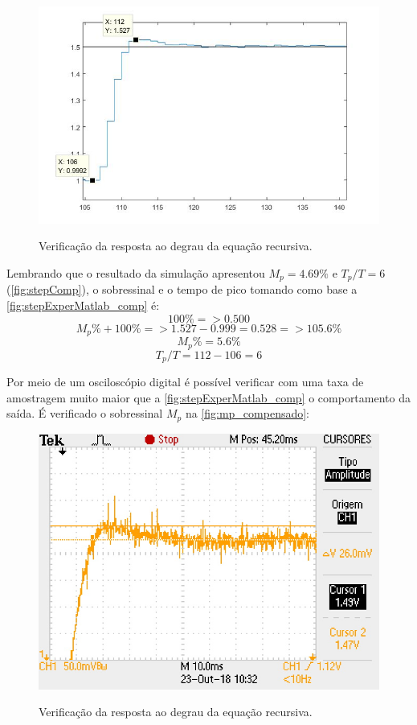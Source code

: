 \documentclass[
	article,			%
	11pt,				%
	oneside,			%
	a4paper,			%
	english,			%
	brazil,				%
	sumario=tradicional
	]{abntex2}
\begin{document}
\begin{figure}[htb!]
	\centering
	\caption{Verificação da resposta ao degrau da equação recursiva.}
	\includegraphics[scale=0.7]{./img/stepExperMatlab_comp.jpg}
	\label{fig:stepExperMatlab_comp}
\end{figure}
Lembrando que o resultado da simulação apresentou  $M_p = 4.69\%$ e  $T_p/T = 6$ (\autoref{fig:stepComp}), o sobressinal e o tempo de pico tomando como base a \autoref{fig:stepExperMatlab_comp} é:
$$
	100\% => 0.500
$$
$$
	M_p\% + 100\%=> 1.527 - 0.999 = 0.528 => 105.6\%
$$
$$
	M_p\% = 5.6\%
$$
$$
T_p/T = 112 - 106 = 6
$$

\pagebreak

Por meio de um osciloscópio digital é possível verificar com uma taxa de amostragem muito maior que a \autoref{fig:stepExperMatlab_comp} o comportamento da saída. 
É verificado o sobressinal $M_p$ na \autoref{fig:mp_compensado}:

\begin{figure}[htb!]
\begin{center}
	\caption{Verificação da resposta ao degrau da equação recursiva.}
	\includegraphics[scale=1.4]{./img/mp_compensado.JPG}
	\label{fig:mp_compensado}
\end{center}
\end{figure}
\end{document}
